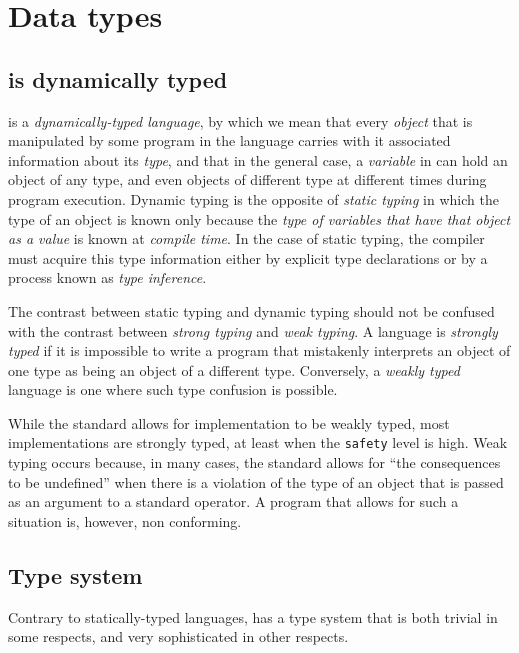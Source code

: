 \chapter{Data types}
\label{chap-data-types}

\section{\commonlisp{} is dynamically typed}

\commonlisp{} is a \emph{dynamically-typed language}, by which we mean
that every \emph{object} that is manipulated by some program in the
language carries with it associated information about its \emph{type},
and that in the general case, a \emph{variable} in \commonlisp{} can
hold an object of any type, and even objects of different type at
different times during program execution.  Dynamic typing is the
opposite of \emph{static typing} in which the type of an object is
known only because the \emph{type of variables that have that object
  as a value} is known at \emph{compile time}.  In the case of static
typing, the compiler must acquire this type information either by
explicit type declarations or by a process known as \emph{type
  inference}.

The contrast between static typing and dynamic typing should not be
confused with the contrast between \emph{strong typing} and \emph{weak
  typing}.  A language is \emph{strongly typed} if it is impossible to
write a program that mistakenly interprets an object of one type as
being an object of a different type.  Conversely, a \emph{weakly
  typed} language is one where such type confusion is possible.

While the \commonlisp{} standard allows for implementation to be
weakly typed, most implementations are strongly typed, at least when
the \texttt{safety} level is high.  Weak typing occurs because, in
many cases, the standard allows for ``the consequences to be
undefined'' when there is a violation of the type of an object that is
passed as an argument to a standard operator.  A program that allows
for such a situation is, however, non conforming.

\section{Type system}
\label{sec-type-system}

Contrary to statically-typed languages, \commonlisp{} has a type
system that is both trivial in some respects, and very sophisticated
in other respects.

